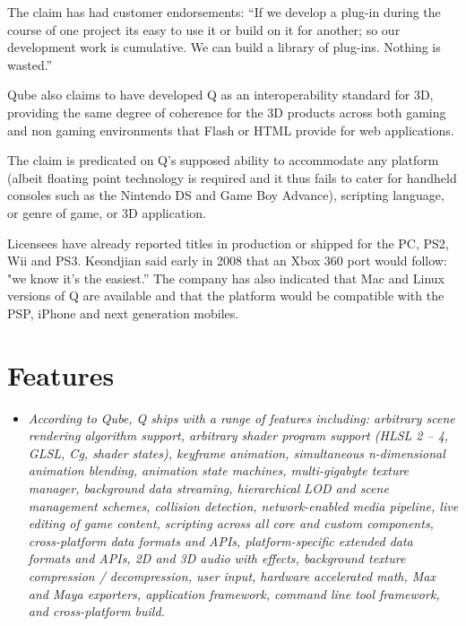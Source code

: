 The claim has had customer endorsements: ``If we develop a plug-in
during the course of one project its easy to use it or build on it for
another; so our development work is cumulative. We can build a library
of plug-ins. Nothing is wasted.''

Qube also claims to have developed Q as an interoperability standard for
3D, providing the same degree of coherence for the 3D products across
both gaming and non gaming environments that Flash or HTML provide for
web applications.

The claim is predicated on Q's supposed ability to accommodate any
platform (albeit floating point technology is required and it thus fails
to cater for handheld consoles such as the Nintendo DS and Game Boy
Advance), scripting language, or genre of game, or 3D application.

Licensees have already reported titles in production or shipped for the
PC, PS2, Wii and PS3. Keondjian said early in 2008 that an Xbox 360 port
would follow: "we know it's the easiest.'' The company has also
indicated that Mac and Linux versions of Q are available and that the
platform would be compatible with the PSP, iPhone and next generation
mobiles.

\section{Features}\label{features}

\begin{itemize}
\item
  \emph{According to Qube, Q ships with a range of features including:
  arbitrary scene rendering algorithm support, arbitrary shader program
  support (HLSL 2 -- 4, GLSL, Cg, shader states), keyframe animation,
  simultaneous n-dimensional animation blending, animation state
  machines, multi-gigabyte texture manager, background data streaming,
  hierarchical LOD and scene management schemes, collision detection,
  network-enabled media pipeline, live editing of game content,
  scripting across all core and custom components, cross-platform data
  formats and APIs, platform-specific extended data formats and APIs, 2D
  and 3D audio with effects, background texture compression /
  decompression, user input, hardware accelerated math, Max and Maya
  exporters, application framework, command line tool framework, and
  cross-platform build.}
\end{itemize}

